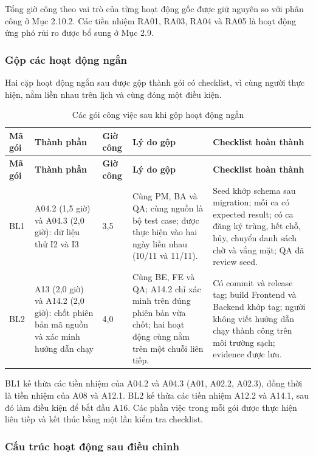 Tổng giờ công theo vai trò của từng hoạt động gốc được giữ nguyên so với phân công ở Mục 2.10.2. Các tiền nhiệm RA01, RA03, RA04 và RA05 là hoạt động ứng phó rủi ro được bổ sung ở Mục 2.9.

\subsubsection{Gộp các hoạt động ngắn}

Hai cặp hoạt động ngắn sau được gộp thành gói có checklist, vì cùng người thực hiện, nằm liền nhau trên lịch và cùng đóng một điều kiện.

{\small
\begin{longtable}{@{}Y{1.1cm}Y{2.8cm}Y{1.2cm}Y{3.6cm}Y{5.0cm}@{}}
\caption{Các gói công việc sau khi gộp hoạt động ngắn}\label{tab:p27-bundle}\\
\toprule
\textbf{Mã gói} & \textbf{Thành phần} & \textbf{Giờ công} & \textbf{Lý do gộp} & \textbf{Checklist hoàn thành} \\
\midrule
\endfirsthead
\toprule
\textbf{Mã gói} & \textbf{Thành phần} & \textbf{Giờ công} & \textbf{Lý do gộp} & \textbf{Checklist hoàn thành} \\
\midrule
\endhead
\bottomrule
\endfoot
BL1 & A04.2 (1,5 giờ) và A04.3 (2,0 giờ): dữ liệu thử I2 và I3 & 3,5 &
Cùng PM, BA và QA; cùng nguồn là bộ test case; được thực hiện vào hai ngày liền nhau (10/11 và 11/11). &
Seed khớp schema sau migration; mỗi ca có expected result; có ca đăng ký trùng, hết chỗ, hủy, chuyển danh sách chờ và vắng mặt; QA đã review seed. \\
\addlinespace
BL2 & A13 (2,0 giờ) và A14.2 (2,0 giờ): chốt phiên bản mã nguồn và xác minh hướng dẫn chạy & 4,0 &
Cùng BE, FE và QA; A14.2 chỉ xác minh trên đúng phiên bản vừa chốt; hai hoạt động cùng nằm trên một chuỗi liên tiếp. &
Có commit và release tag; build Frontend và Backend khớp tag; người không viết hướng dẫn chạy thành công trên môi trường sạch; evidence được lưu. \\
\end{longtable}
}

BL1 kế thừa các tiền nhiệm của A04.2 và A04.3 (A01, A02.2, A02.3), đồng thời là tiền nhiệm của A08 và A12.1. BL2 kế thừa các tiền nhiệm A12.2 và A14.1, sau đó làm điều kiện để bắt đầu A16. Các phần việc trong mỗi gói được thực hiện liên tiếp và kết thúc bằng một lần kiểm tra checklist.

\subsubsection{Cấu trúc hoạt động sau điều chỉnh}

